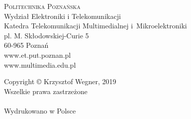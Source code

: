 \thispagestyle{empty}
\begin{flushleft}
  \textsc{Politechnika Poznańska}\\%
  Wydział Elektroniki i Telekomunikacji\\%
  Katedra Telekomunikacji Multimedialnej i~Mikroelektroniki\\[1em]
  
  pl. M. Skłodowskiej-Curie 5\\
  60-965 Poznań\\[1em]
  
  www.et.put.poznan.pl\\
  www.multimedia.edu.pl
\end{flushleft}

\vfill

\begin{flushleft}
  Copyright © Krzysztof Wegner, 2019\\
  Wszelkie prawa zastrzeżone\\
  \ISBN\\
  Wydrukowano w Polsce\\[1em]
  
\end{flushleft}
\clearpage
